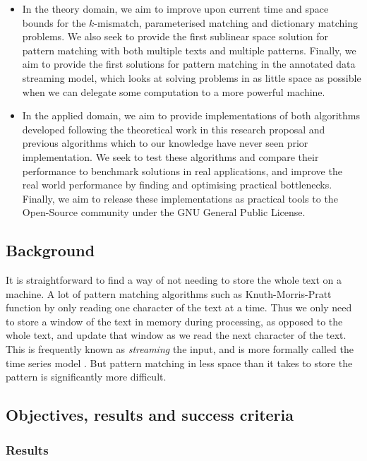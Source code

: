 \documentclass[a4paper,11pt]{article}
\begin{document}
    \begin{itemize}
        \item In the theory domain, we aim to improve upon current time and space bounds for the $k$-mismatch, parameterised matching and dictionary matching problems. We also seek to provide the first sublinear space solution for pattern matching with both multiple texts and multiple patterns. Finally, we aim to provide the first solutions for pattern matching in the annotated data streaming model, which looks at solving problems in as little space as possible when we can delegate some computation to a more powerful machine.
        \item In the applied domain, we aim to provide implementations of both algorithms developed following the theoretical work in this research proposal and previous algorithms which to our knowledge have never seen prior implementation. We seek to test these algorithms and compare their performance to benchmark solutions in real applications, and improve the real world performance by finding and optimising practical bottlenecks. Finally, we aim to release these implementations as practical tools to the Open-Source community under the GNU General Public License.
    \end{itemize}

    \subsection{Background}

    It is straightforward to find a way of not needing to store the whole text on a machine. A lot of pattern matching algorithms such as Knuth-Morris-Pratt \cite{kmp} function by only reading one character of the text at a time. Thus we only need to store a window of the text in memory during processing, as opposed to the whole text, and update that window as we read the next character of the text. This is frequently known as \textit{streaming} the input, and is more formally called the time series model  \cite{TCS-002}. But pattern matching in less space than it takes to store the pattern is significantly more difficult.

    \subsection{Objectives, results and success criteria}

    \subsubsection{Results}
\end{document}
